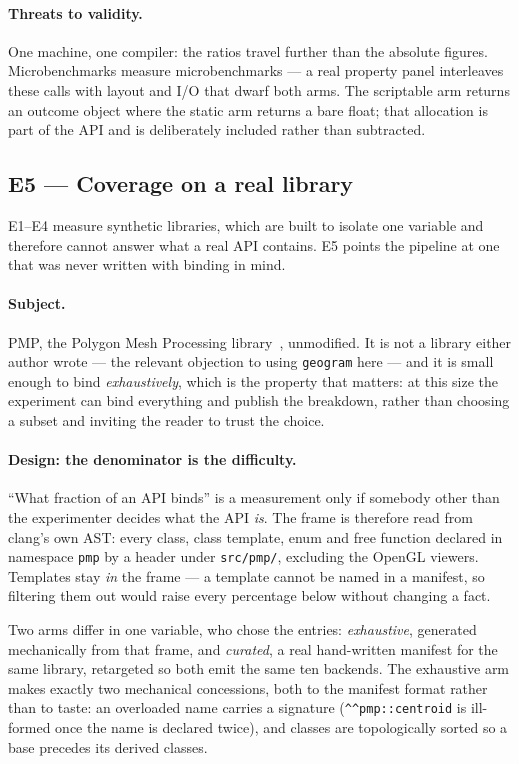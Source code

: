 \documentclass[11pt,a4paper]{article}
\newcommand{\code}[1]{\texttt{\small #1}}
\begin{document}
\paragraph{Threats to validity.} One machine, one compiler: the ratios travel
further than the absolute figures. Microbenchmarks measure microbenchmarks --- a
real property panel interleaves these calls with layout and I/O that dwarf both
arms. The scriptable arm returns an outcome object where the static arm returns
a bare float; that allocation is part of the API and is deliberately included
rather than subtracted.

\subsection{E5 --- Coverage on a real library}
\label{sec:e5}

E1--E4 measure synthetic libraries, which are built to isolate one variable and
therefore cannot answer what a real API contains. E5 points the pipeline at one
that was never written with binding in mind.

\paragraph{Subject.} PMP, the Polygon Mesh Processing
library~\cite{pmp}, unmodified. It is not a library either author wrote --- the
relevant objection to using \code{geogram} here --- and it is small enough to
bind \emph{exhaustively}, which is the property that matters: at this size the
experiment can bind everything and publish the breakdown, rather than choosing a
subset and inviting the reader to trust the choice.

\paragraph{Design: the denominator is the difficulty.} ``What fraction of an API
binds'' is a measurement only if somebody other than the experimenter decides
what the API \emph{is}. The frame is therefore read from clang's own AST: every
class, class template, enum and free function declared in namespace \code{pmp}
by a header under \code{src/pmp/}, excluding the OpenGL viewers. Templates stay
\emph{in} the frame --- a template cannot be named in a manifest, so filtering
them out would raise every percentage below without changing a fact.

Two arms differ in one variable, who chose the entries:
\emph{exhaustive}, generated mechanically from that frame, and \emph{curated},
a real hand-written manifest for the same library, retargeted so both emit the
same ten backends. The exhaustive arm makes exactly two mechanical concessions,
both to the manifest format rather than to taste: an overloaded name carries a
signature (\code{\^{}\^{}pmp::centroid} is ill-formed once the name is declared
twice), and classes are topologically sorted so a base precedes its derived
classes.
\end{document}
